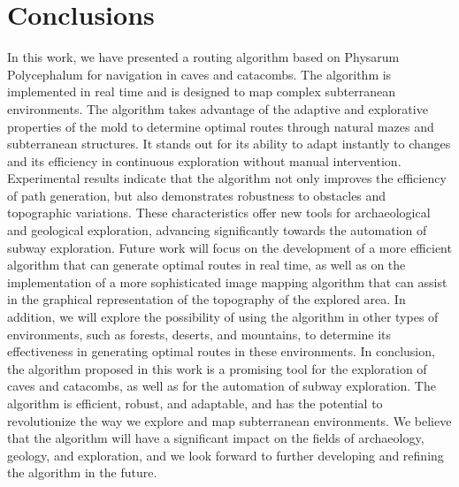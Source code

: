 \documentclass[conference]{IEEEtran}
\begin{document}
\section{Conclusions}
\label{sec:conclusions}
    In this work, we have presented a routing algorithm based on Physarum Polycephalum for navigation in caves and catacombs. 
        The algorithm is implemented in real time and is designed to map complex subterranean environments. The algorithm takes 
        advantage of the adaptive and explorative properties of the mold to determine optimal routes through natural mazes and 
        subterranean structures. It stands out for its ability to adapt instantly to changes and its efficiency in continuous exploration 
        without manual intervention. Experimental results indicate that the algorithm not only improves the efficiency of path generation, 
        but also demonstrates robustness to obstacles and topographic variations. These characteristics offer new tools for archaeological 
        and geological exploration, advancing significantly towards the automation of subway exploration.
    \vskip 0.2cm
    Future work will focus on the development of a more efficient algorithm that can generate optimal routes in real time, 
        as well as on the implementation of a more sophisticated image mapping algorithm that can assist in the graphical 
        representation of the topography of the explored area. In addition, we will explore the possibility of using the algorithm 
        in other types of environments, such as forests, deserts, and mountains, to determine its effectiveness in generating optimal 
        routes in these environments.
    \vskip 0.2cm
    In conclusion, the algorithm proposed in this work is a promising tool for the exploration of caves and catacombs, 
        as well as for the automation of subway exploration. The algorithm is efficient, robust, and adaptable, and has the 
        potential to revolutionize the way we explore and map subterranean environments. We believe that the algorithm will 
        have a significant impact on the fields of archaeology, geology, and exploration, and we look forward to further 
        developing and refining the algorithm in the future.



\end{document}
